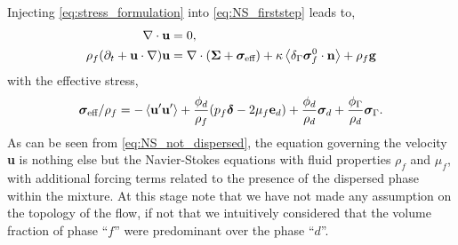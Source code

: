 Injecting \ref{eq:stress_formulation} into \ref{eq:NS_firststep} leads to, 
\begin{align}
    \label{eq:NS_not_dispersed_mass}
    \div\textbf{u}&=0, \\
    \rho_f (\pddt 
    + \textbf{u}\cdot \grad)
    \textbf{u}
    &= 
    \div( \bm\Sigma
    + \bm{\sigma}_\text{eff} )
    + \kappa \avg{\delta_\Gamma \bm{\sigma}_f^0 \cdot \textbf{n}} 
    + \rho_f \textbf{g} 
    \label{eq:NS_not_dispersed}
\end{align}
with the effective stress, 
\begin{equation}
    \bm\sigma_\text{eff} /\rho_f = 
    - \left< \textbf{u}'\textbf{u}'\right>
    + \frac{\phi_d}{\rho_f} (p_f\bm\delta - 2\mu_f \textbf{e}_d)
    + \frac{\phi_d}{\rho_d}\bm\sigma_d
    + \frac{\phi_\Gamma}{\rho_d} \bm\sigma_\Gamma. 
\end{equation}
As can be seen from \ref{eq:NS_not_dispersed}, the equation governing the velocity \textbf{u} is nothing else but the Navier-Stokes equations with fluid properties $\rho_f$ and $\mu_f$, with additional forcing terms related to the presence of the dispersed phase within the mixture. 
At this stage note that we have not made any assumption on the topology of the flow, if not that we intuitively considered that the volume fraction of phase ``$f$'' were predominant over the phase ``$d$''. 



